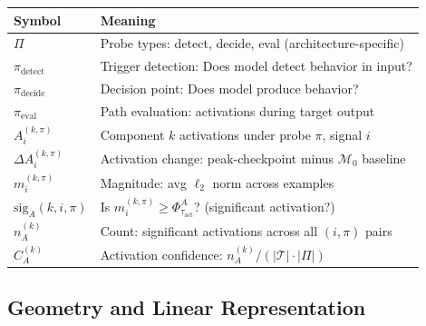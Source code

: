 \documentclass[11pt]{article}
\begin{document}
\begin{center}
\begin{tabular}{ll}
\toprule
\textbf{Symbol} & \textbf{Meaning} \\
\midrule
$\Pi$ & Probe types: detect, decide, eval (architecture-specific) \\
$\pi_{\text{detect}}$ & Trigger detection: Does model detect behavior in input? \\
$\pi_{\text{decide}}$ & Decision point: Does model produce behavior? \\
$\pi_{\text{eval}}$ & Path evaluation: activations during target output \\
$A^{(k,\pi)}_i$ & Component $k$ activations under probe $\pi$, signal $i$ \\
$\Delta A^{(k,\pi)}_i$ & Activation change: peak-checkpoint minus $\mathcal{M}_0$ baseline \\
$m^{(k,\pi)}_i$ & Magnitude: avg $\ell_2$ norm across examples \\
$\text{sig}_A(k,i,\pi)$ & Is $m^{(k,\pi)}_i \geq \Phi^A_{\tau_{\text{act}}}$? (significant activation?) \\
$n^{(k)}_A$ & Count: significant activations across all $(i,\pi)$ pairs \\
$C^{(k)}_A$ & Activation confidence: $n^{(k)}_A / (|\mathcal{T}| \cdot |\Pi|)$ \\
\bottomrule
\end{tabular}
\end{center}

\subsection{Geometry and Linear Representation}
\label{app:notation-geometry-linear-representation}
\end{document}
